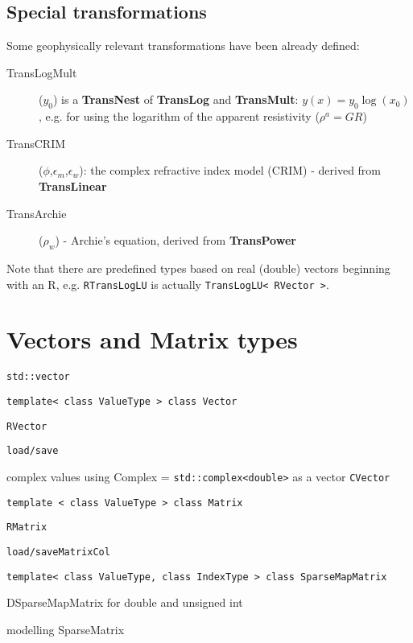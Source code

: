 \subsection*{Special transformations}
Some geophysically relevant transformations have been already defined:
\begin{description}
\item[TransLogMult]($y_0$) is a {\bf TransNest} of {\bf TransLog} and {\bf TransMult}: $y(x)=y_0\log(x_0)$, e.g. for using the logarithm of the apparent resistivity ($\rho^a=G R$)
\item[TransCRIM]($\phi$,$\epsilon_m$,$\epsilon_w$): the complex refractive index model (CRIM) - derived from {\bf TransLinear}
\item[TransArchie]($\rho_w$) - Archie's equation, derived from {\bf TransPower}
\end{description}

Note that there are predefined types based on real (double) vectors beginning with an R, e.g. \lstinline|RTransLogLU| is actually \lstinline|TransLogLU< RVector >|.


\section{Vectors and Matrix types}\label{app:matrix}
\sperre

\lstinline|std::vector|

\lstinline|template< class ValueType > class Vector|

\lstinline|RVector| 

\lstinline|load/save|

complex values using Complex = \lstinline|std::complex<double>| as a vector \lstinline|CVector|

\lstinline|template < class ValueType > class Matrix|

\lstinline|RMatrix|

\lstinline|load/saveMatrixCol|

\lstinline|template< class ValueType, class IndexType > class SparseMapMatrix|

DSparseMapMatrix for double and unsigned int

modelling SparseMatrix